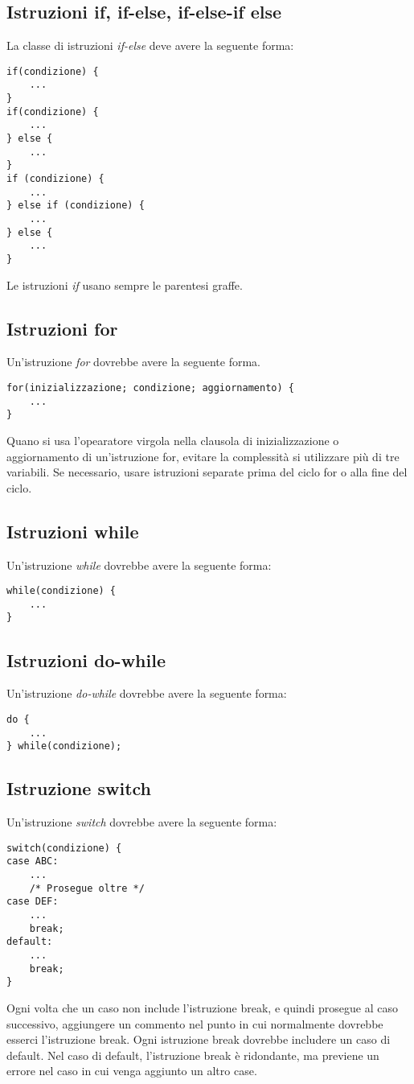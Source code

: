 \subsection{Istruzioni if, if-else, if-else-if else}
La classe di istruzioni \textit{if-else} deve avere la seguente forma:
\clearpage
\begin{lstlisting}
if(condizione) {
	...
}
if(condizione) {
	...
} else {
	...
}
if (condizione) {
	...
} else if (condizione) {
	...
} else {
	...
}
\end{lstlisting}
Le istruzioni \textit{if} usano sempre le parentesi graffe.
\subsection{Istruzioni for}
Un'istruzione \textit{for} dovrebbe avere la seguente forma.
\begin{lstlisting}
for(inizializzazione; condizione; aggiornamento) {
	...
}
\end{lstlisting}
Quano si usa l'opearatore virgola nella clausola di inizializzazione o aggiornamento di un'istruzione for, evitare la complessità si utilizzare più di tre variabili. Se necessario, usare istruzioni separate prima del ciclo for o alla fine del ciclo.
\subsection{Istruzioni while}
Un'istruzione \textit{while} dovrebbe avere la seguente forma:
\begin{lstlisting}
while(condizione) {
	...
}
\end{lstlisting}
\subsection{Istruzioni do-while}
Un'istruzione \textit{do-while} dovrebbe avere la seguente forma:
\begin{lstlisting}
do {
	...
} while(condizione);
\end{lstlisting}
\subsection{Istruzione switch}
Un'istruzione \textit{switch} dovrebbe avere la seguente forma:
\begin{lstlisting}
switch(condizione) {
case ABC:
	...
	/* Prosegue oltre */
case DEF:
	...
	break;
default:
	...
	break;
}
\end{lstlisting}
Ogni volta che un caso non include l’istruzione break, e quindi prosegue al caso successivo, aggiungere un commento nel punto in cui normalmente dovrebbe esserci l’istruzione break. Ogni istruzione break dovrebbe includere un caso di default. Nel caso di default, l’istruzione break è ridondante, ma previene un errore nel caso in cui venga aggiunto un altro case.
